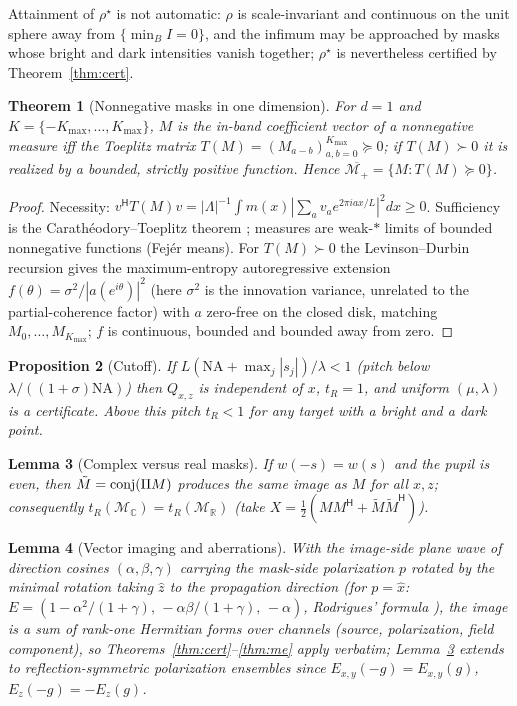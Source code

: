 \documentclass[11pt,a4paper]{article}
\newtheorem{theorem}{Theorem}\newtheorem{lemma}[theorem]{Lemma}\newtheorem{proposition}[theorem]{Proposition}
\newcommand{\R}{\mathbb{R}}\newcommand{\C}{\mathbb{C}}\newcommand{\PSD}{\succeq 0}
\newcommand{\I}{I}\newcommand{\rhostar}{\rho^{\star}}
\newcommand{\NA}{\mathrm{NA}}
\begin{document}
\begin{remark}
Attainment of $\rhostar$ is not automatic: $\rho$ is scale-invariant and continuous on the unit sphere away from $\{\min_B\I=0\}$, and the infimum may be approached by masks whose bright and dark intensities vanish together; $\rhostar$ is nevertheless certified by Theorem~\ref{thm:cert}.
\end{remark}
\begin{theorem}[Nonnegative masks in one dimension]\label{thm:toeplitz}
For $d=1$ and $K=\{-K_{\max},\dots,K_{\max}\}$, $M$ is the in-band coefficient vector of a nonnegative measure iff the Toeplitz matrix $T(M)=(M_{a-b})_{a,b=0}^{K_{\max}}\PSD$; if $T(M)\succ0$ it is realized by a bounded, strictly positive function. Hence $\overline{\mathcal M_+}=\{M:T(M)\PSD\}$.
\end{theorem}
\begin{proof}
Necessity: $v^{\mathsf H}T(M)v=|\Lambda|^{-1}\int m(x)|\sum_av_ae^{2\pi iax/L}|^2dx\ge0$. Sufficiency is the Carath\'eodory--Toeplitz theorem \cite{grenander1958}; measures are weak-$*$ limits of bounded nonnegative functions (Fej\'er means). For $T(M)\succ0$ the Levinson--Durbin recursion gives the maximum-entropy autoregressive extension $f(\theta)=\sigma^2/|a(e^{i\theta})|^2$ (here $\sigma^2$ is the innovation variance, unrelated to the partial-coherence factor) with $a$ zero-free on the closed disk, matching $M_0,\dots,M_{K_{\max}}$; $f$ is continuous, bounded and bounded away from zero.
\end{proof}
\begin{proposition}[Cutoff]\label{prop:cutoff}
If $L(\NA+\max_j|s_j|)/\lambda<1$ (pitch below $\lambda/((1+\sigma)\NA)$) then $Q_{x,z}$ is independent of $x$, $t_R=1$, and uniform $(\mu,\lambda)$ is a certificate. Above this pitch $t_R<1$ for any target with a bright and a dark point.
\end{proposition}
\begin{lemma}[Complex versus real masks]\label{lem:complex}
If $w(-s)=w(s)$ and the pupil is even, then $\tilde M=\operatorname{conj}(\Pi M)$ produces the same image as $M$ for all $x,z$; consequently $t_R(\mathcal M_\C)=t_R(\mathcal M_\R)$ (take $X=\tfrac12(MM^{\mathsf H}+\tilde M\tilde M^{\mathsf H})$).
\end{lemma}
\begin{lemma}[Vector imaging and aberrations]\label{lem:vector}
With the image-side plane wave of direction cosines $(\alpha,\beta,\gamma)$ carrying the mask-side polarization $p$ rotated by the minimal rotation taking $\hat z$ to the propagation direction (for $p=\hat x$: $E=(1-\alpha^2/(1+\gamma),\,-\alpha\beta/(1+\gamma),\,-\alpha)$, Rodrigues' formula \cite{mack_vector}), the image is a sum of rank-one Hermitian forms over channels (source, polarization, field component), so Theorems~\ref{thm:cert}--\ref{thm:me} apply verbatim; Lemma~\ref{lem:complex} extends to reflection-symmetric polarization ensembles since $E_{x,y}(-g)=E_{x,y}(g)$, $E_z(-g)=-E_z(g)$.
\end{lemma}
\end{document}
